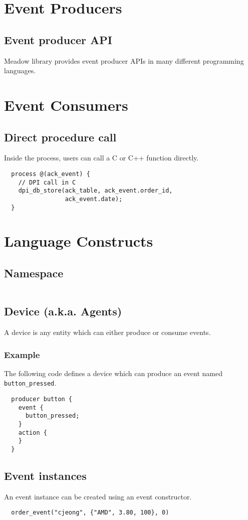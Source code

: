 \documentclass{pamsbook}
\begin{document}
{\section{Event Producers}
\subsection{Event producer API}
Meadow library provides event producer APIs in many different programming
languages. 

\section{Event Consumers}
\subsection{Direct procedure call}
Inside the process, users can call a C or C++ function directly. 
{\small
\begin{verbatim}
  process @(ack_event) {
    // DPI call in C
    dpi_db_store(ack_table, ack_event.order_id, 
                 ack_event.date);
  }
\end{verbatim}
}

\section{Language Constructs}
\subsection{Namespace}
\begin{verbatim}
\end{verbatim}

\subsection{Device (a.k.a. Agents)}
A device is any entity which can either produce or consume events.

\subsubsection{Example} The following code defines a device which can
produce an event named \verb+button_pressed+.
\begin{verbatim}
  producer button {
    event {
      button_pressed;
    }
    action {
    }
  }
\end{verbatim}

\subsection{Event instances}
An event instance can be created using an event constructor.
{\small
\begin{verbatim} 
  order_event("cjeong", {"AMD", 3.80, 100}, 0)
\end{verbatim}
}

}
\end{document}
